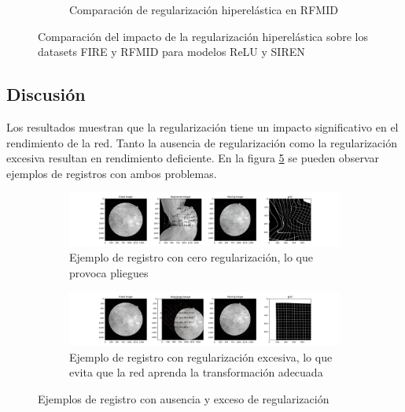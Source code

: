 \begin{figure}[tbp]
\begin{subfigure}[b]{0.48\textwidth}
        \caption{Comparación de regularización hiperelástica en RFMID}
        \label{fig:barplot_hyper_reg_comparison_MLP_vs_SIREN_RFMID}
    \end{subfigure}
    \caption{Comparación del impacto de la regularización hiperelástica sobre los datasets FIRE y RFMID para modelos ReLU y SIREN}
    \label{fig:barplot_hyper_reg_comparison}
\end{figure}

\subsection{Discusión}
\label{subsec:Discusion-regularization}

Los resultados muestran que la regularización tiene un impacto significativo en el rendimiento de la red. Tanto la ausencia de regularización como la regularización excesiva resultan en rendimiento deficiente.
En la figura \ref{fig:regularization_examples} se pueden observar ejemplos de registros con ambos problemas.

\begin{figure}[tbp]
    \centering
    \begin{subfigure}[b]{0.45\textwidth}
        \centering
        \includegraphics[width=\textwidth]{imaxes/reg_examples/no_reg_example.png}
        \caption{Ejemplo de registro con cero regularización, lo que provoca pliegues}
        \label{fig:no_reg_example}
    \end{subfigure}\hfill
    \begin{subfigure}[b]{0.45\textwidth}
        \centering
        \includegraphics[width=\textwidth]{imaxes/reg_examples/too_much_reg_example.png}
        \caption{Ejemplo de registro con regularización excesiva, lo que evita que la red aprenda la transformación adecuada}
        \label{fig:too_much_reg_example}
    \end{subfigure}
    \caption{Ejemplos de registro con ausencia y exceso de regularización}
    \label{fig:regularization_examples}
\end{figure}

